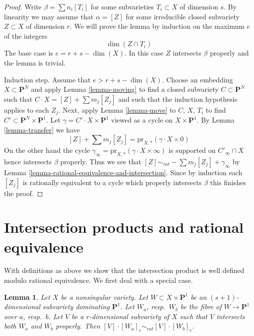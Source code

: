 \documentclass{stacks-project}
\theoremstyle{plain}
\newtheorem{lemma}[subsection]{Lemma}
\theoremstyle{definition}
\theoremstyle{remark}
\numberwithin{equation}{subsection}
\begin{document}
\begin{proof}
Write $\beta = \sum n_i[T_i]$ for some subvarieties $T_i \subset X$
of dimension $s$. By linearity we may assume that $\alpha = [Z]$ for
some irreducible closed subvariety $Z \subset X$ of dimension $r$.
We will prove the lemma by induction on the maximum $e$ of the integers
$$
\dim(Z \cap T_i)
$$
The base case is $e = r + s - \dim(X)$. In this case $Z$ intersects
$\beta$ properly and the lemma is trivial.

\medskip\noindent
Induction step. Assume that $e > r + s - \dim(X)$. Choose an embedding
$X \subset \mathbf{P}^N$ and apply Lemma \ref{lemma-moving} to find a
closed subvariety $C \subset \mathbf{P}^N$ such that
$C \cdot X = [Z] + \sum m_j[Z_j]$ and such that the induction
hypothesis applies to each $Z_j$. Next, apply Lemma \ref{lemma-move}
to $C$, $X$, $T_i$ to find $C' \subset \mathbf{P}^N \times \mathbf{P}^1$.
Let $\gamma = C' \cdot X \times \mathbf{P}^1$ viewed as a cycle
on $X \times \mathbf{P}^1$. By Lemma \ref{lemma-transfer} we have
$$
[Z] + \sum m_j[Z_j] = \text{pr}_{X, *}(\gamma \cdot X \times 0)
$$
On the other hand the cycle
$\gamma_\infty = \text{pr}_{X, *}(\gamma \cdot X \times \infty)$
is supported on $C'_\infty \cap X$ hence intersects $\beta$ properly.
Thus we see that $[Z] \sim_{rat} - \sum m_j[Z_j] + \gamma_\infty$
by Lemma \ref{lemma-rational-equivalence-and-intersection}. Since by
induction each $[Z_j]$ is rationally equivalent to a cycle which properly
intersects $\beta$ this finishes the proof.
\end{proof}



\section{Intersection products and rational equivalence}
\label{section-intersections-and-rational-equivalence}

\noindent
With definitions as above we show that the intersection product
is well defined modulo rational equivalence. We first deal with a
special case.

\begin{lemma}
\label{lemma-well-defined-special-case}
Let $X$ be a nonsingular variety. Let
$W \subset X \times \mathbf{P}^1$ be an $(s + 1)$-dimensional subvariety
dominating $\mathbf{P}^1$. Let $W_a$, resp.\ $W_b$ be the fibre of
$W \to \mathbf{P}^1$ over $a$, resp.\ $b$. Let $V$ be a $r$-dimensional
subvariety of $X$ such that $V$ intersects both $W_a$ and
$W_b$ properly. Then $[V] \cdot [W_a]_r \sim_{rat} [V] \cdot [W_b]_r$.
\end{lemma}
\end{document}
